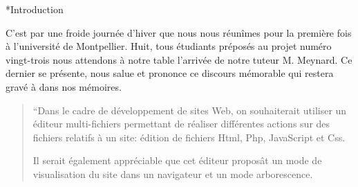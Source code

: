 \documentclass[a4paper, 12pt]{report}
\begin{document}
	\begin{chapter}*{Introduction}


	C'est par une froide journée d'hiver que nous nous réunîmes pour la première fois à l'université de Montpellier. 
	Huit, tous étudiants préposés au projet numéro vingt-trois nous attendons à notre table l'arrivée de notre tuteur M. Meynard. 
	Ce dernier se présente, nous salue et prononce ce discours mémorable qui restera gravé à dans nos mémoires.\\
	\begin{quotation}
		``Dans le cadre de développement de sites Web, on souhaiterait utiliser un éditeur multi-fichiers permettant de réaliser différentes actions sur
		des fichiers relatifs à un site: édition de fichiers Html, Php, JavaScript et Css.

		Il serait également appréciable que cet éditeur proposât un mode de visualisation du site dans un navigateur et un mode arborescence.


\end{quotation}
\end{chapter}
\end{document}
